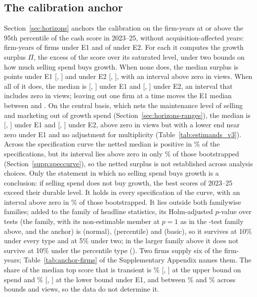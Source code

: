 \subsection{The calibration anchor}\label{sec:empirics-anchor}
Section~\ref{sec:horizons} anchors the calibration on the firm-years at or above the 95th percentile of the cash score in 2023--25, without acquisition-affected years: \AncNEone{} firm-years of \AncFirmsEone{} firms under E1 and \AncNEtwo{} of \AncFirmsEtwo{} under E2. For each it computes the growth surplus $\Pi$, the excess of the score over its saturated level, under two bounds on how much selling spend buys growth. When none does, the median surplus is \AncPiLbEone{} points under E1 [\AncPiLbEoneLo, \AncPiLbEoneHi] and \AncPiLbEtwo{} under E2 [\AncPiLbEtwoLo, \AncPiLbEtwoHi], with an interval above zero in \AncPiLbCount{} views. When all of it does, the median is \AncPiUbEone{} [\AncPiUbEoneLo, \AncPiUbEoneHi] under E1 and \AncPiUbEtwo{} [\AncPiUbEtwoLo, \AncPiUbEtwoHi] under E2, an interval that includes zero in \AncPiUbCount{} views; leaving out one firm at a time moves the E1 median between \AncLooLo{} and \AncLooHi. On the central basis, which nets the maintenance level of selling and marketing out of growth spend (Section~\ref{sec:horizons-ranges}), the median is \AncPiNetEone{} [\AncPiNetEoneLo, \AncPiNetEoneHi] under E1 and \AncPiNetEtwo{} [\AncPiNetEtwoLo, \AncPiNetEtwoHi] under E2, above zero in \AncPiNetCount{} views but with a lower end near zero under E1 and no adjustment for multiplicity (Table~\ref{tab:estimands_v3}). Across the specification curve the netted median is positive in \ScAncNetShare\% of the specifications, but its interval lies above zero in only \ScAncNetBootShare\% of those bootstrapped (Section~\ref{supp:speccurve}), so the netted surplus is not established across analysis choices. Only the statement in which no selling spend buys growth is a conclusion: if selling spend does not buy growth, the best scores of 2023--25 exceed their durable level. It holds in every specification of the curve, with an interval above zero in \ScAncLbBootShare\% of those bootstrapped. It lies outside both familywise families; added to the family of headline statistics, its Holm-adjusted $p$-value over \FamBNAnchor{} tests (the family, with its non-estimable member at $p=1$ as in the \FamEighteenN-test family above, and the anchor) is \HolmAnchorFifteenNormal{} (normal), \HolmAnchorFifteenPercentile{} (percentile) and \HolmAnchorFifteenBasic{} (basic), so it survives at 10\% under every type and at 5\% under two; in the larger family above it does not survive at 10\% under the percentile type (\HolmEighteenAnchorPercentile). Two firms supply six of the \AncNEone{} firm-years; Table~\ref{tab:anchor-firms} of the Supplementary Appendix names them. The share of the median top score that is transient is \AncTrUbEone\% [\AncTrUbEoneLo, \AncTrUbEoneHi] at the upper bound on spend and \AncTrLbEone\% [\AncTrLbEoneLo, \AncTrLbEoneHi] at the lower bound under E1, and between \AncTrAllLo\% and \AncTrAllHi\% across bounds and views, so the data do not determine it.


